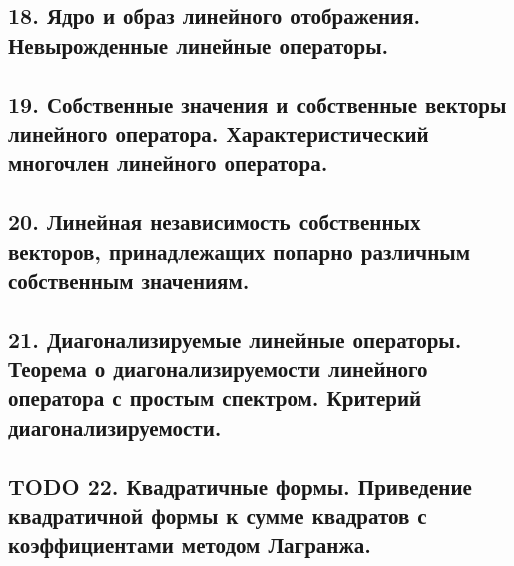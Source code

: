 \documentclass[11pt]{article}
\begin{document}


\subsection{18. Ядро и образ линейного отображения. Невырожденные линейные операторы.}
\label{sec:orge2b664c}




\subsection{19. Собственные значения и собственные векторы линейного оператора. Характеристический многочлен линейного оператора.}
\label{sec:org1d2b264}




\subsection{20. Линейная независимость собственных векторов, принадлежащих попарно различным собственным значениям.}
\label{sec:org512834c}




\subsection{21. Диагонализируемые линейные операторы. Теорема о диагонализируемости линейного оператора с простым спектром. Критерий диагонализируемости.}
\label{sec:org00114bf}




\subsection{{\bfseries\sffamily TODO} 22. Квадратичные формы. Приведение квадратичной формы к сумме квадратов с коэффициентами методом Лагранжа.}
\label{sec:org8f2625e}
\end{document}
